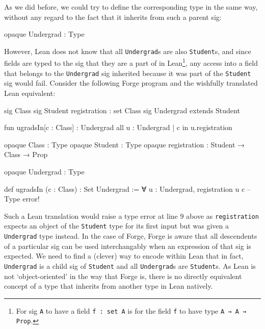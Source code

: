 As we did before, we could try to define the corresponding type in the same way, without any regard to the fact that it inherits from such a parent sig: 
\begin{lean*}
opaque Undergrad : Type
\end{lean*}
However, Lean does not know that all \texttt{Undergrad}s are also \texttt{Student}s, and since fields are typed to the sig that they are a part of in Lean\footnote{For sig \texttt{A} to have a field \texttt{f : set A} is for the field \texttt{f} to have type \texttt{A → A → Prop}.}, any access into a field that belongs to the \texttt{Undergrad} sig inherited because it was part of the \texttt{Student} sig would fail. Consider the following Forge program and the wishfully translated Lean equivalent:

\vspace{0.5em}
\noindent\begin{minipage}{0.5\textwidth}
\begin{forge}
sig Class {}
sig Student {
  registration : set Class
}
sig Undergrad extends Student {}

fun ugradsIn[c : Class] : Undergrad {
  all u : Undergrad |
    c in u.registration
}
\end{forge}
\end{minipage}%
\begin{minipage}{0.5\textwidth}
\begin{lean*}
opaque Class : Type
opaque Student : Type
opaque registration : Student → Class → Prop

opaque Undergrad : Type

def ugradsIn (c : Class) : Set Undergrad :=
  ∀ u : Undergrad, 
    registration u c -- Type error!

\end{lean*}
\end{minipage}
\vspace{0.5em}

Such a Lean translation would raise a type error at line 9 above as \texttt{registration} expects an object of the \texttt{Student} type for its first input but was given a \texttt{Undergrad} type instead. In the case of Forge, Forge is aware that all descendents of a particular sig can be used interchangably when an expression of that sig is expected. We need to find a (clever) way to encode within Lean that in fact, \texttt{Undergrad} is a child sig of \texttt{Student} and all \texttt{Undergrad}s are \texttt{Student}s. As Lean is not `object-oriented' in the way that Forge is, there is no directly equivalent concept of a type that inherits from another type in Lean natively. 

